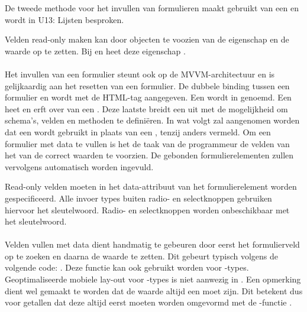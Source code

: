 De tweede methode voor het invullen van formulieren maakt gebruikt van een  en wordt in U13: Lijsten besproken.

Velden read-only maken kan door objecten te voozien van de  eigenschap en de waarde op  te zetten.
Bij  en  heet deze eigenschap .


\paragraph{\kendo}
Het invullen van een formulier steunt ook op de MVVM-architectuur en is gelijkaardig aan het resetten van een formulier.
De dubbele binding tussen een formulier en  wordt met de HTML-tag  aangegeven.
Een  wordt in \kendo{}  genoemd.
Een  heet  en erft over van een .
Deze laatste breidt een  uit met de mogelijkheid om schema's,  velden en methoden te definiëren.  
In wat volgt zal aangenomen worden dat een  wordt gebruikt in plaats van een ,  tenzij anders vermeld.
Om een formulier met data te vullen is het de taak van de programmeur de velden van het  van de correct waarden te voorzien.
De gebonden formulierelementen zullen vervolgens automatisch worden ingevuld.


Read-only velden moeten in het data-attribuut van het formulierelement worden gespecificeerd.
Alle invoer types buiten radio- en selectknoppen gebruiken hiervoor het  sleutelwoord.
Radio- en selectknoppen worden onbeschikbaar met het  sleutelwoord.

\paragraph{\lungo}
Velden vullen met data dient handmatig te gebeuren door eerst het formulierveld op te zoeken en daarna de waarde te zetten.
Dit gebeurt typisch volgens de volgende code: .
Deze functie kan ook gebruikt worden voor -types.
Geoptimaliseerde mobiele lay-out voor -types is niet aanwezig in \lungo.
Een opmerking dient wel gemaakt te worden dat de waarde altijd een  moet zijn.
Dit betekent dus voor getallen dat deze altijd eerst moeten worden omgevormd met de \js{}-functie . 

